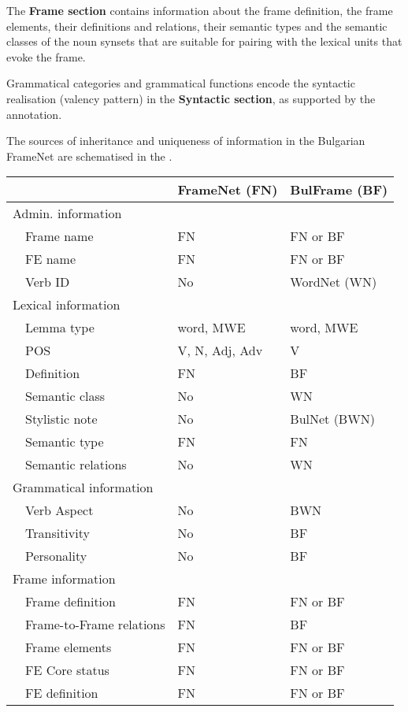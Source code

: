 \documentclass[output=paper,colorlinks,citecolor=brown]{langscibook}
\begin{document}
The \textbf{Frame section} contains information about the frame definition, the frame elements, their definitions and relations, their semantic types and the semantic classes of the noun synsets that are suitable for pairing with the lexical units that evoke the frame.

Grammatical categories and grammatical functions encode the syntactic realisation (valency pattern) in the \textbf{Syntactic section}, as supported by the annotation.

The sources of inheritance and uniqueness of information in the Bulgarian FrameNet are schematised in the .

\begin{table}
    \begin{tabular}{llll}
    \lsptoprule
     &  & FrameNet (FN) & BulFrame (BF)  \\\midrule
     \multicolumn{4}{l}{Admin. information}\\
     & Frame name  & FN  & FN or BF\\
     &  FE name & FN &  FN or BF \\
     & Verb ID  & No & WordNet (WN) \\
     \multicolumn{4}{l}{Lexical information}\\
     & Lemma type & word, MWE &  word, MWE\\
     & POS & V, N, Adj, Adv & V \\
     & Definition & FN & BF\\
     & Semantic class & No & WN \\
     & Stylistic note & No & BulNet (BWN)\\
     & Semantic type & FN &  FN\\
     & Semantic relations & No &  WN\\
     \multicolumn{4}{l}{Grammatical information}\\
     & Verb Aspect & No & BWN \\
     & Transitivity & No & BF \\
     & Personality & No & BF \\
     \multicolumn{4}{l}{Frame information}\\
     & Frame definition & FN & FN or BF \\
     & Frame-to-Frame relations & FN & BF\\
     & Frame elements  & FN & FN or BF \\
     & FE Core status & FN & FN or BF \\
     & FE definition & FN &  FN or BF  \\

\end{tabular}
\end{table}
\end{document}
